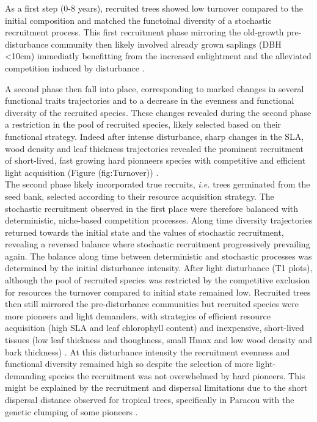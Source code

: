 \documentclass[fleqn,10pt]{ArtEcoFoG} %
\begin{document}
As a first step (0-8 years), recruited trees showed low turnover
compared to the initial composition and matched the functoinal diversity
of a stochastic recruitment process. This first recruitment phase
mirroring the old-growth pre-disturbance community then likely involved
already grown saplings (DBH \textless{}10cm) immediatly benefitting from
the increased enlightment and the alleviated competition induced by
disturbance \citep{Herault2010}.

A second phase then fall into place, corresponding to marked changes in
several functional traits trajectories and to a decrease in the evenness
and functional diversity of the recruited species. These changes
revealed during the second phase a restriction in the pool of recruited
species, likely selected based on their functional strategy. Indeed
after intense disturbance, sharp changes in the SLA, wood density and
leaf thickness trajectories revealed the prominent recruitment of
short-lived, fast growing hard pionneers species with competitive and
efficient light acquisition (Figure \citet{ref}(fig:Turnover))
\citep{Wright2004, Chave2009b, Herault2011, Reich2014}.\\
The second phase likely incorporated true recruits, \emph{i.e.} trees
germinated from the seed bank, selected according to their resource
acquisition strategy. The stochastic recruitment observed in the first
place were therefore balanced with deterministic, niche-based
competition processes. Along time diversity trajectories returned
towards the initial state and the values of stochastic recruitment,
revealing a reversed balance where stochastic recruitment progressively
prevailing again. The balance along time between deterministic and
stochastic processes was determined by the initial disturbance
intensity. After light disturbance (T1 plots), although the pool of
recruited species was restricted by the competitive exclusion for
resources the turnover compared to initial state remained low. Recruited
trees then still mirrored the pre-disturbance communities but recruited
species were more pioneers and light demanders, with strategies of
efficient resource acquisition (high SLA and leaf chlorophyll content)
and inexpensive, short-lived tissues (low leaf thickness and thoughness,
small Hmax and low wood density and bark thickness)
\citep{Hubbell1999, Sheil2003, Bongers2009}. At this disturbance
intensity the recruitment evenness and functional diversity remained
high so despite the selection of more light-demanding species the
recruitment was not overwhelmed by hard pioneers. This might be
explained by the recruitment and dispersal limitations due to the short
dispersal distance observed for tropical trees, specifically in Paracou
with the genetic clumping of some pioneers
\citep{Leclerc2015, Scotti2015a}.
\end{document}
